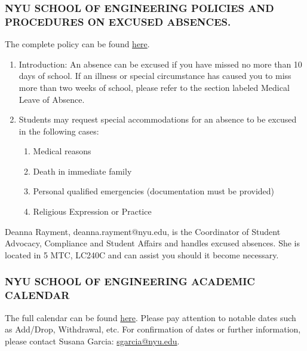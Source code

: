 \documentclass[10pt]{article}
\begin{document}
\subsubsection{NYU SCHOOL OF ENGINEERING POLICIES AND PROCEDURES ON EXCUSED ABSENCES.}
The complete policy can be found \href{https://engineering.nyu.edu/campus-and-community/student-life/office-student-affairs/policies}{here}.
\begin{enumerate}[label=\Alph*.]\itemsep0em 
	\item Introduction:  An absence can be excused if you have missed no more than 10 days of school. If an illness or special circumstance has caused you to miss more than two weeks of school, please refer to the section labeled Medical Leave of Absence.
	
	\item Students may request special accommodations for an absence to be excused in the following cases:

	\begin{enumerate}[label=\arabic*.]\itemsep0em 
		\item	Medical reasons
		\item	Death in immediate family
		\item	Personal qualified emergencies (documentation must be provided)
		\item	Religious Expression or Practice
	
	\end{enumerate}

\end{enumerate}
Deanna Rayment, deanna.rayment@nyu.edu, is the Coordinator of Student Advocacy, Compliance and Student Affairs and handles excused absences. She is located in 5 MTC, LC240C and can assist you should it become necessary. 

\subsubsection{NYU SCHOOL OF ENGINEERING ACADEMIC CALENDAR}
The full calendar can be found \href{https://www.nyu.edu/registrar/calendars/university-academic-calendar.html}{here}.
Please pay attention to notable dates such as Add/Drop, Withdrawal, etc. For confirmation of dates or further information, please contact Susana Garcia: \href{mailto:sgarcia@nyu.edu}{sgarcia@nyu.edu}. 
\end{document}

